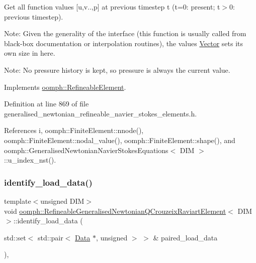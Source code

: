 Get all function values \mbox{[}u,v..,p\mbox{]} at previous timestep t (t=0\+: present; t$>$0\+: previous timestep). 

Note\+: Given the generality of the interface (this function is usually called from black-\/box documentation or interpolation routines), the values \hyperlink{classoomph_1_1Vector}{Vector} sets its own size in here.

Note\+: No pressure history is kept, so pressure is always the current value. 

Implements \hyperlink{classoomph_1_1RefineableElement_ada6f0efe831ffefb1d2829ce01d45bfc}{oomph\+::\+Refineable\+Element}.



Definition at line 869 of file generalised\+\_\+newtonian\+\_\+refineable\+\_\+navier\+\_\+stokes\+\_\+elements.\+h.



References i, oomph\+::\+Finite\+Element\+::nnode(), oomph\+::\+Finite\+Element\+::nodal\+\_\+value(), oomph\+::\+Finite\+Element\+::shape(), and oomph\+::\+Generalised\+Newtonian\+Navier\+Stokes\+Equations$<$ D\+I\+M $>$\+::u\+\_\+index\+\_\+nst().

\mbox{\label{classoomph_1_1RefineableGeneralisedNewtonianQCrouzeixRaviartElement_a14c12617fd3fe6ea248c2ec54993b0a5}} 
\subsubsection{\texorpdfstring{identify\+\_\+load\+\_\+data()}{identify\_load\_data()}}
{\footnotesize\ttfamily template$<$unsigned D\+IM$>$ \\
void \hyperlink{classoomph_1_1RefineableGeneralisedNewtonianQCrouzeixRaviartElement}{oomph\+::\+Refineable\+Generalised\+Newtonian\+Q\+Crouzeix\+Raviart\+Element}$<$ D\+IM $>$\+::identify\+\_\+load\+\_\+data (\begin{DoxyParamCaption}\item[{std\+::set$<$ std\+::pair$<$ \hyperlink{classoomph_1_1Data}{Data} $\ast$, unsigned $>$ $>$ \&}]{paired\+\_\+load\+\_\+data }\end{DoxyParamCaption})\hspace{0.3cm}{\ttfamily [inline]}, {\ttfamily [virtual]}}



